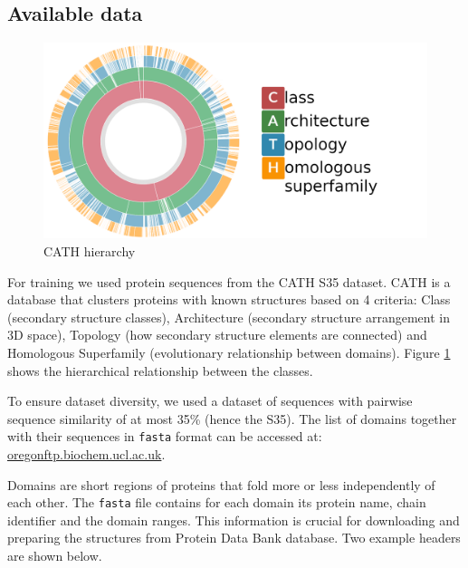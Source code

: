 \subsection{Available data}
    
\begin{figure}[b!]
    \centering
    \includegraphics[width=\linewidth]{imgs_tomas/cath.png}
    \caption{CATH hierarchy \cite{cath}}
    \label{fig:cath}
\end{figure}
    
For training we used protein sequences from the CATH S35 dataset. 
CATH is a database that clusters proteins with known structures based on 4 criteria: Class (secondary structure classes), Architecture (secondary structure arrangement in 3D space), Topology (how secondary structure elements are connected) and Homologous Superfamily (evolutionary relationship between domains). 
Figure \ref{fig:cath} shows the hierarchical relationship between the classes.
    
To ensure dataset diversity, we used a dataset of sequences with pairwise sequence similarity of at most 35\% (hence the S35). 
The list of domains together with their sequences in \texttt{fasta} format can be accessed at: \href{ftp://orengoftp.biochem.ucl.ac.uk/cath/releases/latest-release/sequence-data/cath-domain-seqs-S35.fa}{oregonftp.biochem.ucl.ac.uk}.
    
Domains are short regions of proteins that fold more or less independently of each other. 
The \texttt{fasta} file contains for each domain its protein name, chain identifier and the domain ranges. 
This information is crucial for downloading and preparing the structures from Protein Data Bank database. 
Two example headers are shown below. 
    

